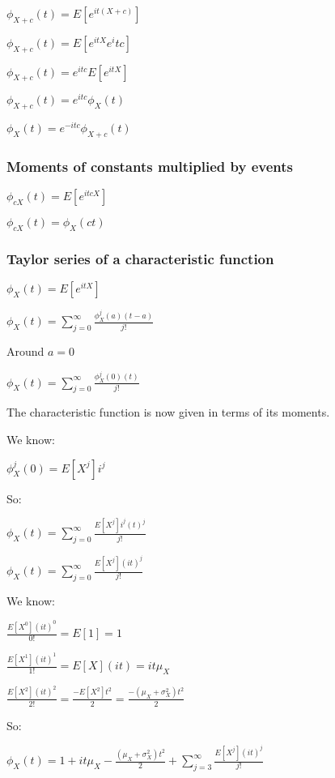 \(\phi_{X+c}(t)=E[e^{it(X+c)}]\)

\(\phi_{X+c}(t)=E[e^{itX}e^itc]\)

\(\phi_{X+c}(t)=e^{itc}E[e^{itX}]\)

\(\phi_{X+c}(t)=e^{itc}\phi_X(t)\)

\(\phi_{X}(t)=e^{-itc}\phi_{X+c}(t)\)

\subsubsection{Moments of constants multiplied by events}

\(\phi_{cX}(t)=E[e^{itcX}]\)

\(\phi_{cX}(t) = \phi_{X}(ct)\)

\subsubsection{Taylor series of a characteristic function}

\(\phi_X(t)=E[e^{itX}]\)

\(\phi_X(t)=\sum_{j=0}^{\infty }\frac{\phi_X^j(a)(t-a)}{j!}\)

Around \(a=0\)

\(\phi_X(t)=\sum_{j=0}^{\infty }\frac{\phi_X^j(0)(t)}{j!}\)

The characteristic function is now given in terms of its moments.

We know:

\(\phi_X^j(0)=E[X^j]i^j\)

So:

\(\phi_X(t)=\sum_{j=0}^{\infty }\frac{E[X^j]i^j(t)^j}{j!}\)

\(\phi_X(t)=\sum_{j=0}^{\infty }\frac{E[X^j](it)^j}{j!}\)

We know:

\(\frac{E[X^0](it)^0}{0!}=E[1]=1\)

\(\frac{E[X^1](it)^1}{1!}=E[X](it)=it\mu_X \)

\(\frac{E[X^2](it)^2}{2!}=\frac{-E[X^2]t^2}{2}=\frac{-(\mu_X +\sigma_X^2 )t^2}{2}\)

So:

\(\phi_X(t)=1+it\mu_X -\frac{(\mu_X +\sigma_X^2 )t^2}{2} +\sum_{j=3}^{\infty }\frac{E[X^j](it)^j}{j!}\)

